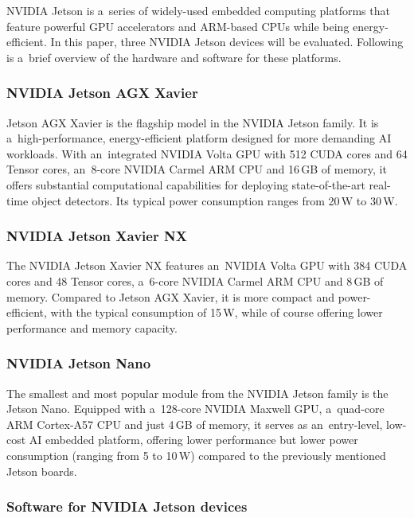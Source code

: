 NVIDIA Jetson is a~series of widely-used embedded computing platforms that
feature powerful GPU accelerators and ARM-based CPUs while being
energy-efficient. In this paper, three NVIDIA Jetson devices will be evaluated.
Following is a~brief overview of the hardware and software for these platforms.


\subsubsection{NVIDIA Jetson AGX Xavier}

Jetson AGX Xavier is the flagship model in the NVIDIA Jetson family. It is
a~high-performance, energy-efficient platform designed for more demanding AI
workloads. With an~integrated NVIDIA Volta GPU with 512 CUDA cores and 64 Tensor
cores, an~8-core NVIDIA Carmel ARM CPU and 16\,GB of memory, it offers substantial
computational capabilities for deploying state-of-the-art real-time object
detectors. Its typical power consumption ranges from 20\,W to 30\,W.


\subsubsection{NVIDIA Jetson Xavier NX}

The NVIDIA Jetson Xavier NX features an~NVIDIA Volta GPU with 384 CUDA cores and
48 Tensor cores, a~6-core NVIDIA Carmel ARM CPU and 8\,GB of memory. Compared
to Jetson AGX Xavier, it is more compact and power-efficient, with the typical
consumption of 15\,W, while of course offering lower performance and memory
capacity.


\subsubsection{NVIDIA Jetson Nano}

The smallest and most popular module from the NVIDIA Jetson family is the Jetson
Nano. Equipped with a~128-core NVIDIA Maxwell GPU, a~quad-core ARM Cortex-A57
CPU and just 4\,GB of memory, it serves as an~entry-level, low-cost AI embedded
platform, offering lower performance but lower power consumption (ranging from 5
to 10\,W) compared to the previously mentioned Jetson boards.


\subsubsection{Software for NVIDIA Jetson devices}


